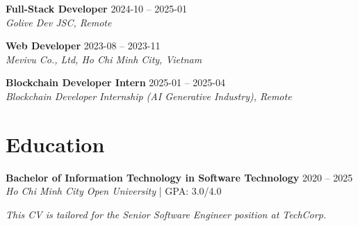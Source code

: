 \documentclass[11pt,a4paper]{article}
\begin{document}
\textbf{ Full-Stack Developer } \hfill 2024-10 -- 2025-01\\
\textit{ Golive Dev JSC, Remote }
\begin{itemize}[leftmargin=*,noitemsep]
\end{itemize}
\vspace{0.2cm}
\textbf{ Web Developer } \hfill 2023-08 -- 2023-11\\
\textit{ Mevivu Co., Ltd, Ho Chi Minh City, Vietnam }
\begin{itemize}[leftmargin=*,noitemsep]
\end{itemize}
\vspace{0.2cm}
\textbf{ Blockchain Developer Intern } \hfill 2025-01 -- 2025-04\\
\textit{ Blockchain Developer Internship (AI Generative Industry), Remote }
\begin{itemize}[leftmargin=*,noitemsep]
\end{itemize}
\vspace{0.2cm}

\section*{Education}

\textbf{ Bachelor of Information Technology in Software Technology } \hfill 2020 -- 2025\\
\textit{ Ho Chi Minh City Open University } | GPA: 3.0/4.0
\vspace{0.2cm}

\vspace{0.5cm}

\textit{This CV is tailored for the Senior Software Engineer position at TechCorp.}
\end{document}
